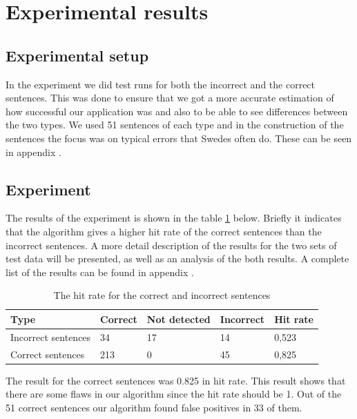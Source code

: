 \documentclass[a4paper,12pt]{article}
\begin{document}
\section{Experimental results}
\label{sec:experimentalresults}

\subsection{Experimental setup}
In the experiment we did test runs for both the incorrect and the correct sentences. This was done to ensure that we got a more accurate estimation of how successful our application was and also to be able to see differences between the two types. We used 51 sentences of each type and in the construction of the sentences the focus was on typical errors that Swedes often do. These can be seen in appendix \label{appendix:A}.

\subsection{Experiment}
The results of the experiment is shown in the table \ref{table:results} below. Briefly it indicates that the algorithm gives a higher hit rate of the correct sentences than the incorrect sentences. A more detail description of the results for the two sets of test data will be presented, as well as an analysis of the both results. A complete list of the results can be found in appendix \label{appendix:A}.

\begin{table}[h]
\begin{center}
\begin{tabular}{lllll}
\hline
Type & Correct & Not detected & Incorrect & Hit rate \\
\hline
Incorrect sentences & 34 & 17 & 14 & 0,523  \\
Correct sentences & 213 & 0 & 45 & 0,825  \\
\hline
\end{tabular}
\caption[Table caption text]{The hit rate for the correct and incorrect sentences}
\label{table:results}
\end{center}
\end{table}

The result for the correct sentences was 0.825 in hit rate. This result shows that there are some flaws in our algorithm since the hit rate should be 1. Out of the 51 correct sentences our algorithm found false positives in 33 of them.
\end{document}
